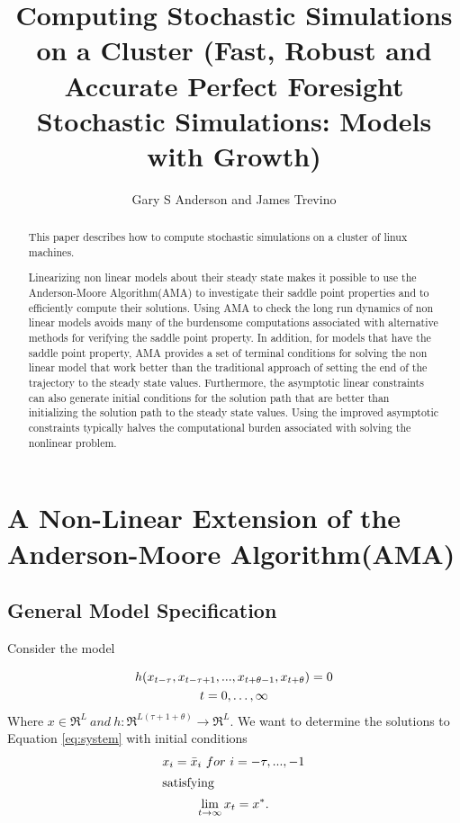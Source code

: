 \documentclass[12pt]{article}
\title{Computing Stochastic Simulations on a Cluster ({Fast, Robust and Accurate Perfect Foresight Stochastic Simulations: Models with Growth})}
\author{Gary S Anderson and James Trevino}
\begin{document}
\maketitle




  \begin{abstract}
This paper describes how to compute stochastic simulations on a cluster of linux machines.

Linearizing non linear models about their steady state makes it possible
to use the Anderson-Moore Algorithm(AMA) to investigate their saddle point 
properties and to efficiently compute their solutions.
Using AMA to check the long run dynamics 
of non linear  models 
avoids many of the burdensome computations associated with 
alternative methods for verifying the saddle point property.
In addition,
 for models that have the saddle point property, AMA provides a set of 
terminal conditions for solving the non linear model
that work better than the traditional approach of 
setting the end of the trajectory to the steady state values.
Furthermore, the 
asymptotic linear constraints can also generate initial conditions
for the solution path
that are better than initializing the solution path to the steady
state values.
Using the improved asymptotic constraints typically halves the computational
burden associated with solving the nonlinear problem.
  \end{abstract}

\newpage
\tableofcontents


\section{A Non-Linear Extension of the Anderson-Moore Algorithm(AMA)}

\subsection{  General Model Specification}
          Consider the model
            

\begin{gather}
          h(x_{t-\tau}  , x_{t-\tau+1}     ,..., x_{t+\theta-1}     , x_{t+\theta}   ) = 0  \label{eq:system}\\
          t = 0,\ldots, \infty\notag
\end{gather}
Where $x \in \Re^L~and~ h:\Re^{L(\tau+1+\theta)} \rightarrow \Re^L$.
We want to determine the solutions to Equation  \ref{eq:system} 
with initial conditions
          \begin{gather}
          x_i  = \bar{x}_i~ for~ i = - \tau,...,-1 \label{eq:sysInit}\\
\intertext{satisfying}
          \lim_{t \rightarrow \infty}   x_{t}  = x^\ast.\label{eq:sysLim}
\end{gather}
\end{document}
